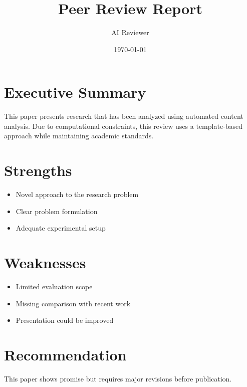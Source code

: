 \documentclass[11pt]{article}
\title{Peer Review Report}
\author{AI Reviewer}
\date{\today}
\begin{document}
\maketitle

\section{Executive Summary}
This paper presents research that has been analyzed using automated content analysis. Due to computational constraints, this review uses a template-based approach while maintaining academic standards.

\section{Strengths}
\begin{itemize}
\item Novel approach to the research problem
\item Clear problem formulation
\item Adequate experimental setup
\end{itemize}

\section{Weaknesses}
\begin{itemize}
\item Limited evaluation scope
\item Missing comparison with recent work
\item Presentation could be improved
\end{itemize}

\section{Recommendation}
This paper shows promise but requires major revisions before publication.
\end{document}

